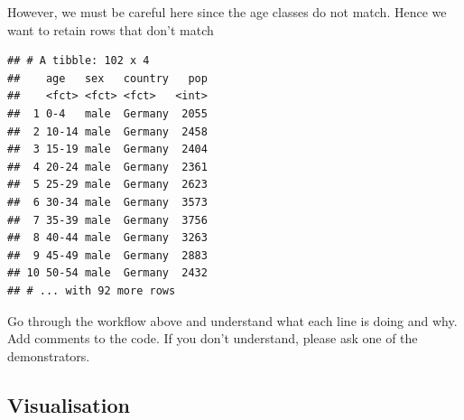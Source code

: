 \documentclass[]{book}
\newenvironment{Shaded}{\begin{snugshade}}{\end{snugshade}}
\newcommand{\KeywordTok}[1]{\textcolor[rgb]{0.13,0.29,0.53}{\textbf{{#1}}}}
\newcommand{\DataTypeTok}[1]{\textcolor[rgb]{0.13,0.29,0.53}{{#1}}}
\newcommand{\StringTok}[1]{\textcolor[rgb]{0.31,0.60,0.02}{{#1}}}
\newcommand{\NormalTok}[1]{{#1}}
\newcommand{\bblockT}[1]{\begin{tcolorbox}[title = Task #1]}
\newcommand{\eblockT}{\end{tcolorbox}}
\theoremstyle{definition}
\theoremstyle{definition}
\theoremstyle{definition}
\theoremstyle{remark}
\begin{document}
However, we must be careful here since the age classes do not match.
Hence we want to retain rows that don't match

\begin{Shaded}
\end{Shaded}

\begin{verbatim}
## # A tibble: 102 x 4
##    age   sex   country   pop
##    <fct> <fct> <fct>   <int>
##  1 0-4   male  Germany  2055
##  2 10-14 male  Germany  2458
##  3 15-19 male  Germany  2404
##  4 20-24 male  Germany  2361
##  5 25-29 male  Germany  2623
##  6 30-34 male  Germany  3573
##  7 35-39 male  Germany  3756
##  8 40-44 male  Germany  3263
##  9 45-49 male  Germany  2883
## 10 50-54 male  Germany  2432
## # ... with 92 more rows
\end{verbatim}

\hypertarget{tsk24}{}\bblockT{24}

Go through the workflow above and understand what each line is doing and
why. Add comments to the code. If you don't understand, please ask one
of the demonstrators. \eblockT

\subsection{Visualisation}\label{visualisation}
\end{document}
